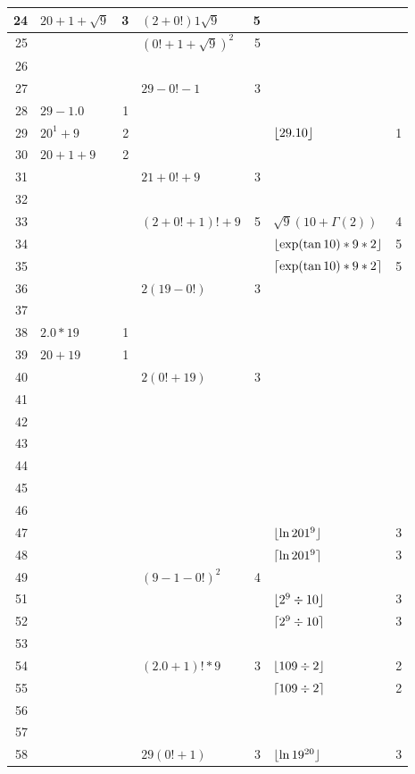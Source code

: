 \begin{longtable}{r l r l r l r}
24 & $20+1+\sqrt{9}$ & 3 & $(2+0!)1\sqrt{9}$ & 5 \\ \midrule
25 & & & ${(0!+1+\sqrt{9})}^{2}$ & 5 \\ \midrule
26 & & \\ \midrule
27 & & & $29-0!-1$ & 3 \\ \midrule
28 & $29-1.0$ & 1 \\ \midrule
29 & $20^1+9$ & 2 & & & $\lfloor29.10\rfloor$ & 1\\ \midrule
\midrule
30 & $20+1+9$ & 2 \\ \midrule
31 & & & $21+0!+9$ & 3 \\ \midrule
32 & & \\ \midrule
33 & & & $(2+0!+1)!+9$ & 5 & $\sqrt{9}(10+\Gamma(2))$ & 4 \\ \midrule
34 & & & & & $\lfloor\exp(\tan10)*9*2\rfloor$ & 5 \\ \midrule
35 & & & & & $\lceil\exp(\tan10)*9*2\rceil$ & 5  \\ \midrule
36 & & & $2(19-0!)$ & 3 \\ \midrule
37 & & \\ \midrule
38 & $2.0*19$ & 1 \\ \midrule
39 & $20+19$ & 1 \\ \midrule
\midrule
40 & & & $2(0!+19)$ & 3 \\ \midrule
41 & & \\ \midrule
42 & & \\ \midrule
43 & & \\ \midrule
44 & & \\ \midrule
45 & & \\ \midrule
46 & & \\ \midrule
47 & & & & & $\lfloor\ln 201^9\rfloor$ & 3 \\ \midrule
48 & & & & & $\lceil\ln 201^9\rceil$ & 3 \\ \midrule
49 & & & ${(9-1-0!)}^2$ & 4 \\ \midrule
\midrule
51 & & & & & $\lfloor2^9\div10\rfloor$ & 3 \\ \midrule
52 & & & & & $\lceil2^9\div10\rceil$ & 3 \\ \midrule
53 & & \\ \midrule
54 & & & $(2.0+1)!*9$ & 3 & $\lfloor109\div2\rfloor$ & 2 \\ \midrule
55 & & & & & $\lceil109\div2\rceil$ & 2 \\ \midrule
56 & & \\ \midrule
57 & & \\ \midrule
58 & & & $29(0!+1)$ & 3 & $\lfloor\ln 19^{20}\rfloor$ & 3 \\ \midrule

\end{longtable}
